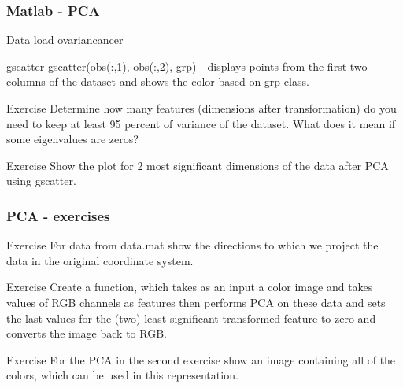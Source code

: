 \documentclass{beamer}
\begin{document}
\begin{frame}
\frametitle{Matlab - PCA}

\begin{block}{Data}
load ovariancancer
\end{block}

\begin{block}{gscatter}
gscatter(obs(:,1), obs(:,2), grp) - displays points from the first two columns of the dataset and shows the color based on grp class.
\end{block}

\begin{block}{Exercise}
Determine how many features (dimensions after transformation) do you need to keep at least 95 percent of variance of the dataset. What does it mean if some eigenvalues are zeros?
\end{block}

\begin{block}{Exercise}
Show the plot for 2 most significant dimensions of the data after PCA using gscatter.
\end{block}
\end{frame}


\begin{frame}
\frametitle{PCA - exercises}

\begin{block}{Exercise}
For data from data.mat show the directions to which we project the data in the original coordinate system.
\end{block}

\begin{block}{Exercise}
Create a function, which takes as an input a color image and takes values of RGB channels as features then performs PCA on these data and sets the last values for the (two) least significant transformed feature to zero and converts the image back to RGB. 
\end{block}

\begin{block}{Exercise}
For the PCA in the second exercise show an image containing all of the colors, which can be used in this representation.
\end{block}
\end{frame}
\end{document}
